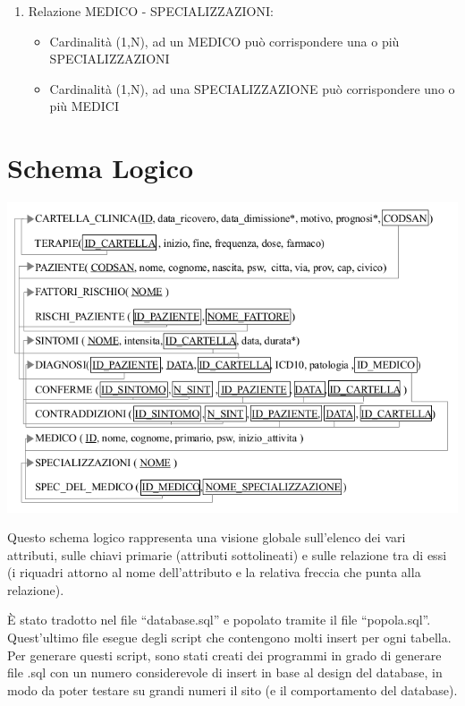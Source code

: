 \documentclass[a4paper,titlepage]{article}
\begin{document}
\begin{enumerate}
\item Relazione MEDICO - SPECIALIZZAZIONI:

\begin{itemize}[leftmargin=0.5cm, topsep=0.25cm, itemsep=0.2cm]

\item Cardinalità (1,N), ad un MEDICO può corrispondere una o più SPECIALIZZAZIONI
\item Cardinalità (1,N), ad una SPECIALIZZAZIONE può corrispondere uno o più MEDICI

\end{itemize}

\end{enumerate}

\newpage

\part{Schema Logico}
    \begin{center}

    \centering
    \includegraphics[scale=0.9]{schema_logico.png}

    \end{center}

Questo schema logico rappresenta una visione globale sull'elenco dei vari attributi, sulle chiavi primarie (attributi sottolineati) e sulle relazione tra di essi (i riquadri attorno al nome dell'attributo e la relativa freccia che punta alla relazione).

È stato tradotto nel file ``database.sql'' e popolato tramite il file ``popola.sql''. Quest'ultimo file esegue degli script che contengono molti insert per ogni tabella.
Per generare questi script, sono stati creati dei programmi in grado di generare file .sql con un numero considerevole di insert in base al design del database, in modo da poter testare su grandi numeri il sito (e il comportamento del database).
\end{document}
